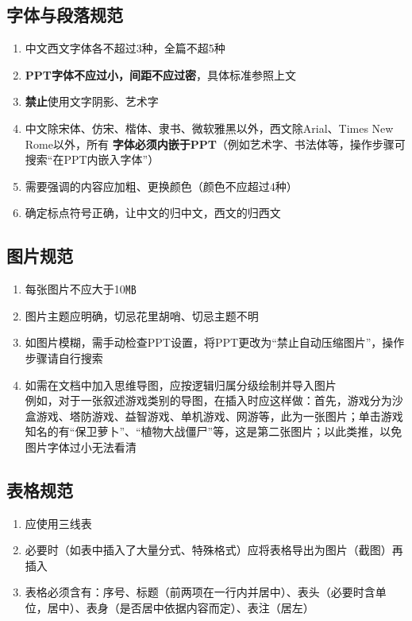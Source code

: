 \subsection[字体与段落规范]{字体与段落规范}
\begin{enumerate}
    \item 中文西文字体各不超过3种，全篇不超5种
    \item \textbf{PPT字体不应过小，间距不应过密}，具体标准参照上文
    \item \textbf{禁止}使用文字阴影、艺术字
    \item 中文除宋体、仿宋、楷体、隶书、微软雅黑以外，西文除Arial、Times New Rome以外，所有 \textbf{字体必须内嵌于PPT}（例如艺术字、书法体等，操作步骤可搜索“在PPT内嵌入字体”）
    \item 需要强调的内容应加粗、更换颜色（颜色不应超过4种）
    \item 确定标点符号正确，让中文的归中文，西文的归西文
\end{enumerate}

\subsection[图片规范]{图片规范}
\begin{enumerate}
    \item 每张图片不应大于10㎆\footnotemark
    \item 图片主题应明确，切忌花里胡哨、切忌主题不明
    \item 如图片模糊，需手动检查PPT设置，将PPT更改为“禁止自动压缩图片”，操作步骤请自行搜索
    \item 如需在文档中加入思维导图，应按逻辑归属分级绘制并导入图片\\
          例如，对于一张叙述游戏类别的导图，在插入时应这样做：首先，游戏分为沙盒游戏、塔防游戏、益智游戏、单机游戏、网游等，此为一张图片；单击游戏知名的有“保卫萝卜”、“植物大战僵尸”等，这是第二张图片；以此类推，以免图片字体过小无法看清
\end{enumerate}

\subsection[表格规范]{表格规范}
\begin{enumerate}
    \item 应使用三线表
    \item 必要时（如表中插入了大量分式、特殊格式）应将表格导出为图片（截图）再插入
    \item 表格必须含有：序号、标题（前两项在一行内并居中）、表头（必要时含单位，居中）、表身（是否居中依据内容而定）、表注（居左）
\end{enumerate}

